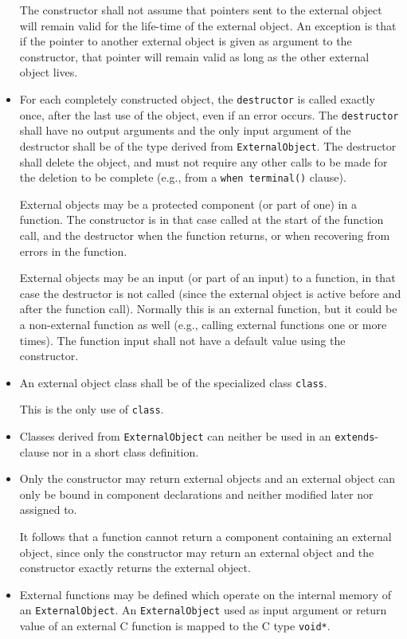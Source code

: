 \begin{itemize}
  The constructor shall not assume that pointers sent to the external object will remain valid for the life-time of the external object.
  An exception is that if the pointer to another external object is given as argument to the constructor, that pointer will remain valid as long as the other external object lives.
\item
  For each completely constructed object, the {\lstinline!destructor!} is called exactly once, after the last use of the object, even if an error occurs.
  The {\lstinline!destructor!} shall have no output arguments and the only input argument of the destructor shall be of the type derived from {\lstinline!ExternalObject!}.
  The destructor shall delete the object, and must not require any other calls to be made for the deletion to be complete (e.g., from a {\lstinline!when terminal()!} clause).
  \begin{nonnormative}
  External objects may be a protected component (or part of one) in a function.
  The constructor is in that case called at the start of the function call, and the destructor when the function returns, or when recovering from errors in the function.
  \end{nonnormative}
  \begin{nonnormative}
  External objects may be an input (or part of an input) to a function, in that case the destructor is not called (since the external object is active before and after the function call).
  Normally this is an external function, but it could be a non-external function as well (e.g., calling external functions one or more times).
  The function input shall not have a default value using the constructor.
  \end{nonnormative}
\item
  An external object class shall be of the specialized class {\lstinline!class!}.
  \begin{nonnormative}
  This is the only use of {\lstinline!class!}.
  \end{nonnormative}
\item
  Classes derived from {\lstinline!ExternalObject!} can neither be used in an {\lstinline!extends!}-clause nor in a short class definition.
\item
  Only the constructor may return external objects and an external object
  can only be bound in component declarations and neither modified later
  nor assigned to.
  \begin{nonnormative}
  It follows that a function cannot return a component containing an external object, since only the constructor may return an external object and the constructor exactly returns the external object.
  \end{nonnormative}
\item
  External functions may be defined which operate on the internal memory
  of an {\lstinline!ExternalObject!}. An {\lstinline!ExternalObject!} used as input argument or
  return value of an external C function is mapped to the C type
  {\lstinline!void*!}.
\end{itemize}

